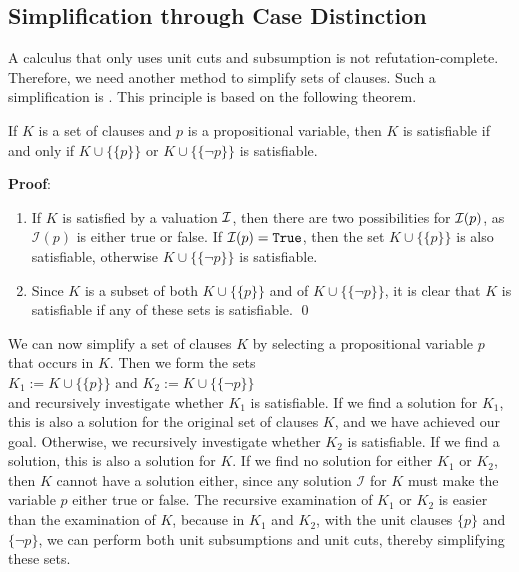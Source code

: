 \subsection{Simplification through Case Distinction}
A calculus that only uses unit cuts and subsumption is not refutation-complete. Therefore, we need another method to simplify sets of clauses.
Such a simplification is . This principle is based on the following theorem.

\begin{Satz}
  If $K$ is a set of clauses and $p$ is a propositional variable,
  then $K$ is satisfiable if and only if $K \cup \bigl\{\{p\}\bigr\}$ or
  $K \cup \bigl\{\{\neg p\}\bigr\}$ is satisfiable.
\end{Satz}

\noindent
\textbf{Proof}:
\begin{enumerate}
\item[``$\Rightarrow$'':] 
  If $K$ is satisfied by a valuation $\mathcal{I}$, then there are two possibilities for $\mathcal{I}(p)$, as 
  $\mathcal{I}(p)$ is either true or false. If $\mathcal{I}(p) = \texttt{True}$, then the set $K \cup
  \bigl\{\{p\}\bigr\}$ is also satisfiable,
  otherwise $K \cup \bigl\{\{\neg p\}\bigr\}$
  is satisfiable.
\item[``$\Leftarrow$'':] 
  Since $K$ is a subset of both $K \cup \bigl\{\{p\}\bigr\}$ and of 
  $K \cup \bigl\{\{\neg p\}\bigr\}$, it is clear that $K$ is satisfiable
  if any of these sets is satisfiable.
\qed
\end{enumerate}

We can now simplify a set of clauses $K$ by selecting a propositional variable $p$ that occurs in $K$.
Then we form the sets \\[0.2cm]
\hspace*{1.3cm} $K_1 := K \cup \bigl\{\{p\}\bigr\}$ \quad and \quad $K_2 := K \cup
\bigl\{\{\neg p\}\bigr\}$
\\[0.2cm]
and recursively investigate whether $K_1$ is satisfiable. If we find a solution for $K_1$,
this is also a solution for the original set of clauses $K$, and we have achieved our goal.
Otherwise, we recursively investigate whether $K_2$ is satisfiable.
If we find a solution, this is also a solution for $K$. If we find no solution
for either $K_1$ or $K_2$, then $K$ cannot have a solution either,
since any solution $\mathcal{I}$ for $K$ must make the variable $p$ either true or false.
The recursive examination of $K_1$ or $K_2$ is easier than the examination of $K$,
because in $K_1$ and $K_2$, with the unit clauses $\{p\}$ and $\{\neg p\}$,
we can perform both unit subsumptions and unit cuts, thereby simplifying these sets.

